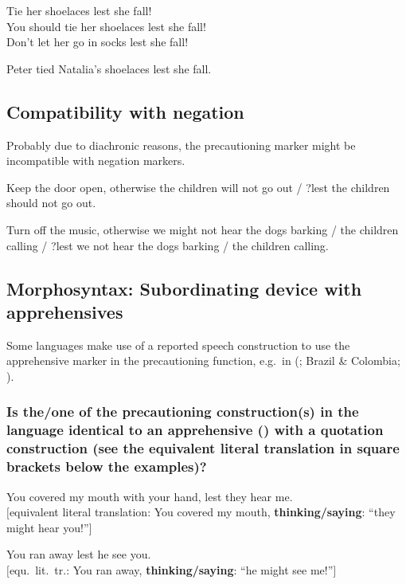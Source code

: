 \documentclass[output=paper,colorlinks,citecolor=brown]{langscibook}
\begin{document}
\ea \label{p51}
\ea \label{p51a} Tie her shoelaces lest she fall! \\
\ex \label{p51b} You should tie her shoelaces lest she fall!\\
\ex \label{p51c} Don't let her go in socks lest she fall!
\z
\z

\ea \label{p52} Peter tied Natalia's shoelaces lest she fall.
\z




\subsection{Compatibility with negation}
\label{subsec:prenegation}

Probably due to diachronic reasons, the precautioning marker might be incompatible with negation markers.

\ea \label{p53} Keep the door open, otherwise the children will not go out \textnormal{/ ?}lest the children should not go out.
\z

\ea \label{p54} Turn off the music, otherwise we might not hear the dogs barking \textnormal{/} the children calling  \textnormal{/ ?}lest we not hear the dogs barking \textnormal{/} the children calling.
\z

\subsection{Morphosyntax: Subordinating device with apprehensives}
\label{subsec:premorphosyntax}

Some languages make use of a reported speech construction to use the apprehensive marker in the precautioning function, e.g.\ in  (; Brazil \& Colombia; \cite[386]{aikhenvald2003}).


\subsubsection{Is the/one of the precautioning construction(s) in the language identical to an apprehensive () with a quotation construction (see the equivalent literal translation in square brackets below the examples)?}
\label{2.5.1}

\ea \label{p55} You covered my mouth with your hand, lest they hear me.\\
\textnormal{$[$equivalent literal translation: You covered my mouth, \textbf{thinking/saying}: ``they might hear you!''$]$}
\z

\ea \label{p56} You ran away lest he see you. \\
\textnormal{$[$equ.\ lit.\ tr.: You ran away, \textbf{thinking/saying}: ``he might see me!''$]$}
\z
\end{document}
